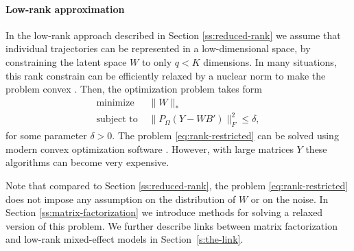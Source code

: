 \documentclass[preprint]{imsart}
\numberwithin{equation}{section}
\theoremstyle{plain}
\begin{document}
\paragraph{Low-rank approximation}
In the low-rank approach described in Section \ref{ss:reduced-rank} we assume that individual trajectories can be represented in a low-dimensional space, by constraining the latent space $W$ to only $q < K$ dimensions. In many situations, this rank constrain can be efficiently relaxed by a nuclear norm to make the problem convex \citep{candes2009exact, fazel2002matrix}. Then, the optimization problem takes form 
\begin{align}
\text{minimize\ \ } & \|W\|_* \nonumber\\
\text{subject to\ \ } &\| P_\Omega(Y - WB') \|_F^2 \leq \delta,\label{eq:rank-restricted}
\end{align} 
for some parameter $\delta > 0$. 
The problem \eqref{eq:rank-restricted} can be solved using modern convex optimization software \citep{grant2008graph,boyd2004convex}. However, with large matrices $Y$ these algorithms can become very expensive.

Note that compared to Section \ref{ss:reduced-rank}, the problem \eqref{eq:rank-restricted} does not impose any assumption on the distribution of $W$ or on the noise.
In Section \ref{ss:matrix-factorization} we introduce methods for solving a relaxed version of this problem. We further describe links between matrix factorization and low-rank mixed-effect models in Section~\ref{s:the-link}. 

\end{document}

